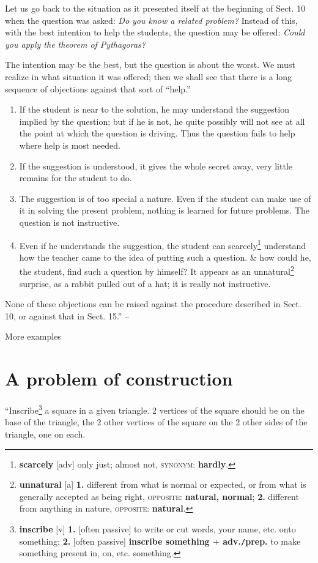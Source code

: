 \documentclass[oneside]{book}
\numberwithin{equation}{section}
\begin{document}
Let us go back to the situation as it presented itself at the beginning of Sect. 10 when the question was asked: \textit{Do you know a related problem?} Instead of this, with the best intention to help the students, the question may be offered: \textit{Could you apply the theorem of Pythagoras?}

The intention may be the best, but the question is about the worst. We must realize in what situation it was offered; then we shall see that there is a long sequence of objections against that sort of ``help.''
\begin{enumerate}
	\item If the student is near to the solution, he may understand the suggestion implied by the question; but if he is not, he quite possibly will not see at all the point at which the question is driving. Thus the question fails to help where help is most needed.
	\item If the suggestion is understood, it gives the whole secret away, very little remains for the student to do.
	\item The suggestion is of too special a nature. Even if the student can make use of it in solving the present problem, nothing is learned for future problems. The question is not instructive.
	\item Even if he understands the suggestion, the student can scarcely\footnote{\textbf{scarcely} [adv] only just; almost not, \textsc{synonym}: \textbf{hardly}.} understand how the teacher came to the idea of putting such a question. \& how could he, the student, find such a question by himself? It appears as an unnatural\footnote{\textbf{unnatural} [a] \textbf{1.} different from what is normal or expected, or from what is generally accepted as being right, \textsc{opposite}: \textbf{natural, normal}; \textbf{2.} different from anything in nature, \textsc{opposite}: \textbf{natural}.} surprise, as a rabbit pulled out of a hat; it is really not instructive.
\end{enumerate}
None of these objections can be raised against the procedure described in Sect. 10, or against that in Sect. 15.'' -- \cite[pp. 22--23]{Polya2014}

\begin{center}
	\LARGE More examples
\end{center}

\section{A problem of construction}
``Inscribe\footnote{\textbf{inscribe} [v] \textbf{1.} [often passive] to write or cut words, your name, etc. onto something; \textbf{2.} [often passive] \textbf{inscribe something $+$ adv.\texttt{/}prep.} to make something present in, on, etc. something.} a square in a given triangle. 2 vertices of the square should be on the base of the triangle, the 2 other vertices of the square on the 2 other sides of the triangle, one on each.
\end{document}

